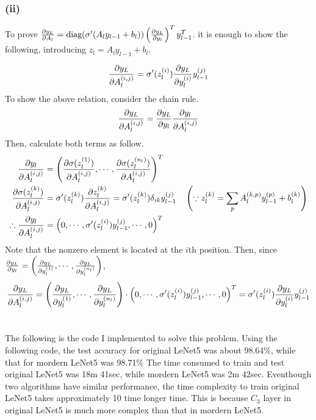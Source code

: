 \documentclass[10pt]{article}
\begin{document}
\subsubsection*{(ii)}
To prove ${\partial y_L \over \partial A_l} = \text{diag}(\sigma^\prime(A_ly_{l-1} + b_l))\left({\partial y_L \over \partial y_l}\right)^Ty_{l-1}^T$.
it is enough to show the following, introducing $z_l = A_ly_{l-1} + b_l$.

\begin{equation}
    {\partial y_L \over \partial A_l^{(i,j)}} = \sigma^\prime(z_l^{(i)}){\partial y_L \over \partial y_l^{(i)}} y_{l-1}^{(j)}
\end{equation}
To show the above relation, consider the chain rule. 
\begin{equation*}
    {\partial y_L \over \partial A_l^{(i,j)}} = {\partial y_L \over \partial y_l} {\partial y_l \over \partial A_l^{(i,j)}} \\ 
\end{equation*}
Then, calculate both terms as follow.
\begin{align*}
    {\partial y_l \over \partial A_l^{(i,j)}} &= \left({\partial \sigma(z_l^{(1)}) \over \partial A_l^{(i,j)}}, \cdots, {\partial \sigma(z_l^{(n_l)}) \over \partial A_l^{(i,j)}}\right)^T \\
    {\partial \sigma(z_l^{(k)}) \over \partial A_l^{(i,j)}} &= \sigma^\prime(z_l^{(k)}){\partial z_l^{(k)}\over \partial A_l^{(i,j)}} = \sigma^\prime(z_l^{(k)})\delta_{ik}y_{l-1}^{(j)} \quad \left(\because z_l^{(k)} = \sum_p A_l^{(k,p)}y_{l-1}^{(p)}+ b_l^{(k)}\right)\\
    \therefore {\partial y_l \over \partial A_l^{(i,j)}} &= \left(0, \cdots, \sigma^\prime(z_l^{(i)})y_{l-1}^{(j)}, \cdots, 0 \right)^T
\end{align*}
Note that the nonzero element is located at the $i$th position. Then, since ${\partial y_L\over \partial y_l} = \left({\partial y_L\over \partial y_l^{(1)}}, \cdots, {\partial y_L\over \partial y_l^{(n_l)}}\right)$,
\begin{equation*}
    {\partial y_L\over \partial A_l^{(i,j)}} = \left({\partial y_L\over \partial y_l^{(1)}}, \cdots, {\partial y_L\over \partial y_l^{(n_l)}}\right) \cdot \left(0, \cdots, \sigma^\prime(z_l^{(i)})y_{l-1}^{(j)}, \cdots, 0 \right)^T = \sigma^\prime(z_l^{(i)}){\partial y_L \over \partial y_l^{(i)}} y_{l-1}^{(j)}
\end{equation*}

\section{}
The following is the code I implemented to solve this problem. Using the following code, the test accuracy for original LeNet5 was about 98.64\%, while that for mordern LeNet5 was 98.71\%
The time consumed to train and test original LeNet5 was 18m 41sec, while mordern LeNet5 was 2m 42sec. 
Eventhough two algorithms have similar performance, the time complexity to train original LeNet5 takes approximately 10 time longer time. This is because $C_3$ layer in original LeNet5 is much more complex than that in mordern LeNet5.
\end{document}
